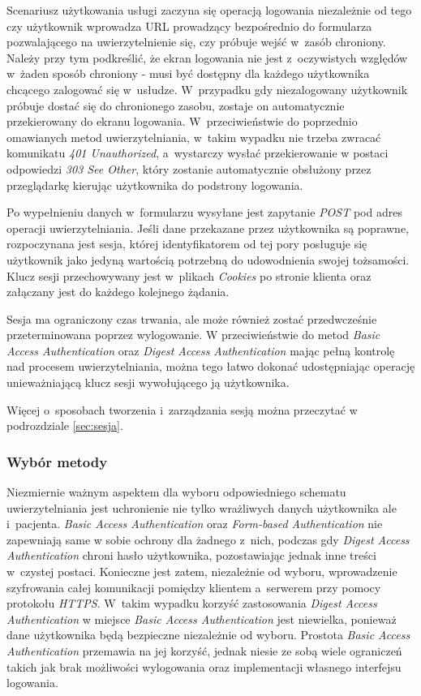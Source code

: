 \documentclass[11pt]{aghdpl}
\begin{document}
Scenariusz użytkowania usługi zaczyna się operacją logowania niezależnie od tego czy użytkownik wprowadza URL prowadzący bezpośrednio do formularza pozwalającego na uwierzytelnienie się, czy próbuje wejść w~zasób chroniony. Należy przy tym podkreślić, że ekran logowania nie jest z~oczywistych względów w~żaden sposób chroniony - musi być dostępny dla każdego użytkownika chcącego zalogować się w~usłudze. W~przypadku gdy niezalogowany użytkownik próbuje dostać się do chronionego zasobu, zostaje on automatycznie przekierowany do ekranu logowania. W~przeciwieństwie do poprzednio omawianych metod uwierzytelniania, w~takim wypadku nie trzeba zwracać komunikatu \emph{401 Unauthorized}, a~wystarczy wysłać przekierowanie w postaci odpowiedzi \emph{303 See Other}, który zostanie automatycznie obsłużony przez przeglądarkę kierując użytkownika do podstrony logowania.

Po wypełnieniu danych w~formularzu wysyłane jest zapytanie \emph{POST} pod adres operacji uwierzytelniania. Jeśli dane przekazane przez użytkownika są poprawne, rozpoczynana jest sesja, której identyfikatorem od tej pory posługuje się użytkownik jako jedyną wartością potrzebną do udowodnienia swojej tożsamości. Klucz sesji przechowywany jest w~plikach \emph{Cookies} po stronie klienta oraz załączany jest do każdego kolejnego żądania.

Sesja ma ograniczony czas trwania, ale może również zostać przedwcześnie przeterminowana poprzez wylogowanie. W przeciwieństwie do metod \emph{Basic Access Authentication} oraz \emph{Digest Access Authentication} mając pełną kontrolę nad procesem uwierzytelniania, można tego łatwo dokonać udostępniając operację unieważniającą klucz sesji wywołującego ją użytkownika.

Więcej o~sposobach tworzenia i~zarządzania sesją można przeczytać w podrozdziale \ref{sec:sesja}.

\subsubsection{Wybór metody}

Niezmiernie ważnym aspektem dla wyboru odpowiedniego schematu uwierzytelniania jest uchronienie nie tylko wrażliwych danych użytkownika ale i~pacjenta. \emph{Basic Access Authentication} oraz \emph{Form-based Authentication} nie zapewniają same w sobie ochrony dla żadnego z~nich, podczas gdy \emph{Digest Access Authentication} chroni hasło użytkownika, pozostawiając jednak inne treści w~czystej postaci. Konieczne jest zatem, niezależnie od wyboru, wprowadzenie szyfrowania całej komunikacji pomiędzy klientem a~serwerem przy pomocy protokołu \emph{HTTPS}. W~takim wypadku korzyść zastosowania \emph{Digest Access Authentication} w miejsce \emph{Basic Access Authentication} jest niewielka, ponieważ dane użytkownika będą bezpieczne niezależnie od wyboru. Prostota \emph{Basic Access Authentication} przemawia na jej korzyść, jednak niesie ze sobą wiele ograniczeń takich jak brak możliwości wylogowania oraz implementacji własnego interfejsu logowania.
\end{document}
